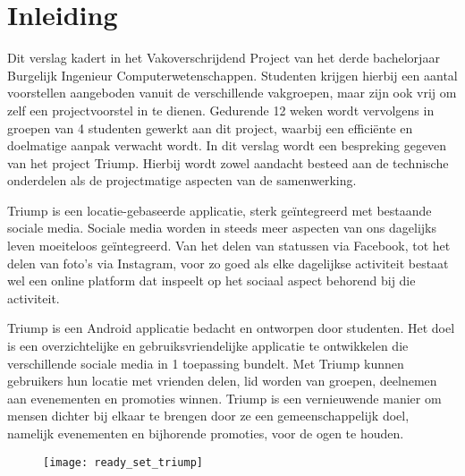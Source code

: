 \chapter{Inleiding}
Dit verslag kadert in het Vakoverschrijdend Project van het derde bachelorjaar Burgelijk Ingenieur Computerwetenschappen. Studenten krijgen hierbij een aantal voorstellen aangeboden vanuit de verschillende vakgroepen, maar zijn ook vrij om zelf een projectvoorstel in te dienen. Gedurende 12 weken wordt vervolgens in groepen van 4 studenten gewerkt aan dit project, waarbij een efficiënte en doelmatige aanpak verwacht wordt. In dit verslag wordt een bespreking gegeven van het project Triump. Hierbij wordt zowel aandacht besteed aan de technische onderdelen als de projectmatige aspecten van de samenwerking.

Triump is een locatie-gebaseerde applicatie, sterk geïntegreerd met bestaande sociale media. Sociale media worden in steeds meer aspecten van ons dagelijks leven moeiteloos geïntegreerd. Van het delen van statussen via Facebook, tot het delen van foto’s via Instagram, voor zo goed als elke dagelijkse activiteit bestaat wel een online platform dat inspeelt op het sociaal aspect behorend bij die activiteit.

Triump is een Android applicatie bedacht en ontworpen door studenten. Het doel is een overzichtelijke en gebruiksvriendelijke applicatie te ontwikkelen die verschillende sociale media in 1 toepassing bundelt. Met Triump kunnen gebruikers hun locatie met vrienden delen, lid worden van groepen, deelnemen aan evenementen en promoties winnen. Triump is een vernieuwende manier om mensen dichter bij elkaar te brengen door ze een gemeenschappelijk doel, namelijk evenementen en bijhorende promoties, voor de ogen te houden.


\begin{figure}[H]
	\centering
	\texttt{[image: ready\_set\_triump]}
	\label{fig:inleiding}
\end{figure}
